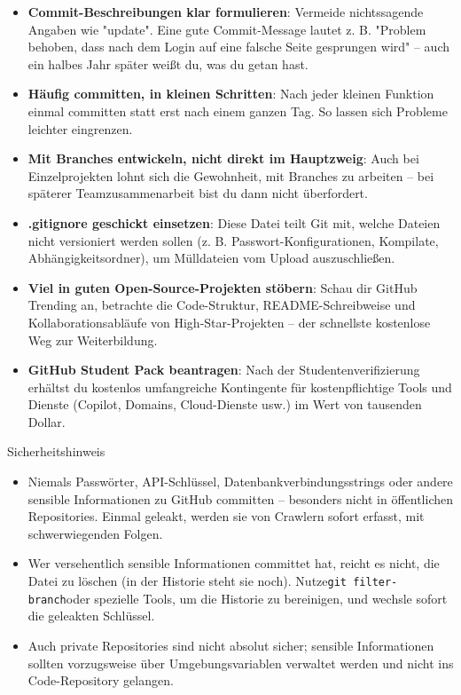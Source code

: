 \begin{itemize}
  \item \textbf{Commit-Beschreibungen klar formulieren}: Vermeide nichtssagende Angaben wie "update". Eine gute Commit-Message lautet z. B. "Problem behoben, dass nach dem Login auf eine falsche Seite gesprungen wird" – auch ein halbes Jahr später weißt du, was du getan hast.
  \item \textbf{Häufig committen, in kleinen Schritten}: Nach jeder kleinen Funktion einmal committen statt erst nach einem ganzen Tag. So lassen sich Probleme leichter eingrenzen.
  \item \textbf{Mit Branches entwickeln, nicht direkt im Hauptzweig}: Auch bei Einzelprojekten lohnt sich die Gewohnheit, mit Branches zu arbeiten – bei späterer Teamzusammenarbeit bist du dann nicht überfordert.
  \item \textbf{.gitignore geschickt einsetzen}: Diese Datei teilt Git mit, welche Dateien nicht versioniert werden sollen (z. B. Passwort-Konfigurationen, Kompilate, Abhängigkeitsordner), um Mülldateien vom Upload auszuschließen.
  \item \textbf{Viel in guten Open-Source-Projekten stöbern}: Schau dir GitHub Trending an, betrachte die Code-Struktur, README-Schreibweise und Kollaborationsabläufe von High-Star-Projekten – der schnellste kostenlose Weg zur Weiterbildung.
  \item \textbf{GitHub Student Pack beantragen}: Nach der Studentenverifizierung erhältst du kostenlos umfangreiche Kontingente für kostenpflichtige Tools und Dienste (Copilot, Domains, Cloud-Dienste usw.) im Wert von tausenden Dollar.
\end{itemize}

\begin{tcbwarn}{Sicherheitshinweis}
\begin{itemize}
  \item Niemals Passwörter, API-Schlüssel, Datenbankverbindungsstrings oder andere sensible Informationen zu GitHub committen – besonders nicht in öffentlichen Repositories. Einmal geleakt, werden sie von Crawlern sofort erfasst, mit schwerwiegenden Folgen.
  \item Wer versehentlich sensible Informationen committet hat, reicht es nicht, die Datei zu löschen (in der Historie steht sie noch). Nutze\texttt{git filter-\allowbreak branch}oder spezielle Tools, um die Historie zu bereinigen, und wechsle sofort die geleakten Schlüssel.
  \item Auch private Repositories sind nicht absolut sicher; sensible Informationen sollten vorzugsweise über Umgebungsvariablen verwaltet werden und nicht ins Code-Repository gelangen.
\end{itemize}

\end{tcbwarn}

